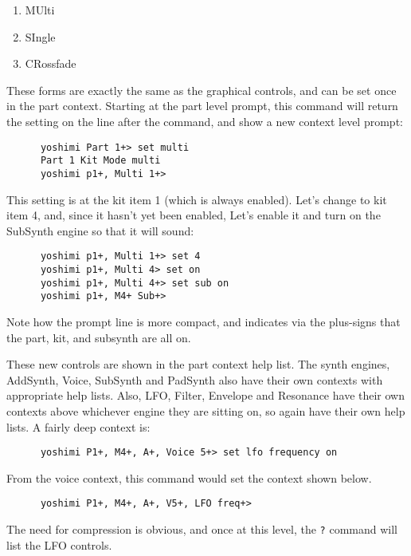    \begin{enumerate}
      \item MUlti
      \item SIngle
      \item CRossfade
   \end{enumerate}

   These forms are exactly the same as the graphical controls, and can be set
   once in the part context. Starting at the part level prompt, this command
   will return the setting on the line after the command, and show a new
   context level prompt:

   \begin{verbatim}
      yoshimi Part 1+> set multi
      Part 1 Kit Mode multi
      yoshimi p1+, Multi 1+>
   \end{verbatim}

   This setting is at the kit item 1 (which is always enabled).
   Let's change to kit item 4, and, since it hasn't yet been enabled,
   Let's enable it and turn on the SubSynth engine so that it will sound:

   \begin{verbatim}
      yoshimi p1+, Multi 1+> set 4
      yoshimi p1+, Multi 4> set on
      yoshimi p1+, Multi 4+> set sub on
      yoshimi p1+, M4+ Sub+>
   \end{verbatim}

   Note how the prompt line is more compact, and indicates via the plus-signs
   that the part, kit, and subsynth are all on.

   These new controls are shown in the part context help list.
   The synth engines, AddSynth, Voice, SubSynth and PadSynth also have their
   own contexts with appropriate help lists.
   Also, LFO, Filter, Envelope and Resonance have their own contexts above
   whichever engine they are sitting on, so again have their own help lists.
   A fairly deep context is:

   \begin{verbatim}
      yoshimi P1+, M4+, A+, Voice 5+> set lfo frequency on
   \end{verbatim}

   From the voice context, this command would set the context shown below.

   \begin{verbatim}
      yoshimi P1+, M4+, A+, V5+, LFO freq+>
   \end{verbatim}

   The need for compression is obvious, and once at this level, the
   \texttt{?} command will list the LFO controls.

